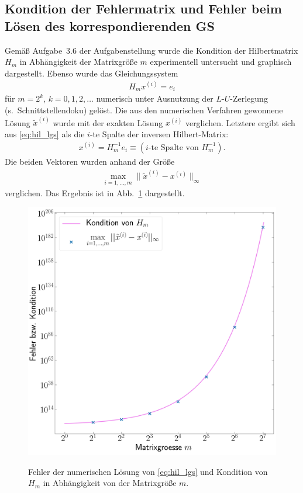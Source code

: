 \documentclass[smallheadings]{scrartcl}
\numberwithin{equation}{section}
\begin{document}
\subsection{Kondition der Fehlermatrix und Fehler beim Lösen des korrespondierenden GS}

Gemäß Aufgabe~3.6 der Aufgabenstellung wurde die Kondition der Hilbertmatrix $H_m$ in Abhängigkeit der Matrixgröße $m$ experimentell untersucht und graphisch dargestellt. Ebenso wurde das Gleichungssystem 
\begin{align}
H_mx^{(i)}=e_i
\label{eq:hil_lgs}
\end{align}
für $m=2^k$, $k=0,1,2,\dots$ numerisch unter Ausnutzung der $L$-$U$-Zerlegung (s.~Schnittstellendoku) gelöst. Die aus den numerischen Verfahren gewonnene Lösung $\tilde{x}^{(i)}$ wurde mit der exakten Lösung $x^{(i)}$ verglichen. Letztere ergibt sich aus \eqref{eq:hil_lgs} als die $i$-te Spalte der inversen Hilbert-Matrix:
\begin{align}
x^{(i)}=H_m^{-1}e_i\equiv(\text{$i$-te Spalte von }H_m^{-1}).
\end{align}
Die beiden Vektoren wurden anhand der Größe
\begin{align*}
\max\limits_{i=1,\dots,m}\|\tilde{x}^{(i)}-x^{(i)}\|_\infty
\end{align*}
verglichen. Das Ergebnis ist in Abb.~\ref{fig:hil_kond_fehl}
dargestellt.

\begin{figure}[H]
\centering
\includegraphics[width=.8\textwidth]{Bericht/Bilder/hil_kond_fehl}
\label{fig:hil_kond_fehl}
\caption{Fehler der numerischen Lösung von \eqref{eq:hil_lgs} und Kondition von $H_m$ in Abhängigkeit von der Matrixgröße $m$.}
\end{figure}
\end{document}
